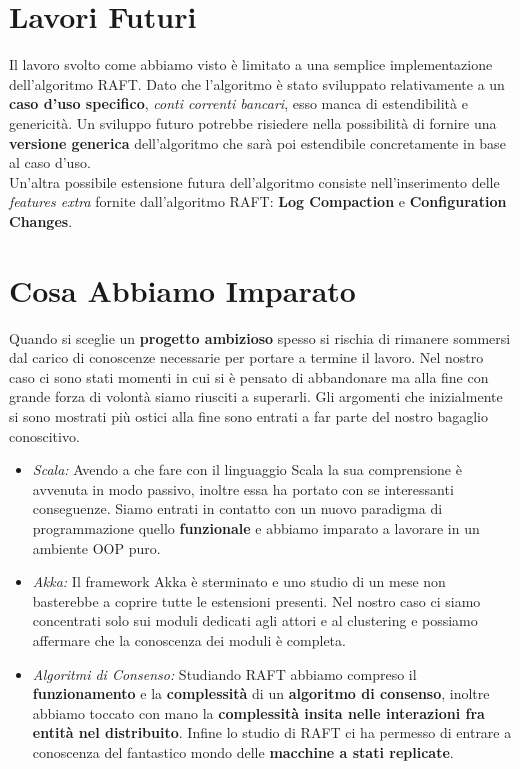 \section{Lavori Futuri}
  Il lavoro svolto come abbiamo visto è limitato a una semplice implementazione dell'algoritmo RAFT. Dato che l'algoritmo è stato sviluppato relativamente a un \textbf{caso d'uso specifico}, \textit{conti correnti bancari}, esso manca di estendibilità e genericità. Un sviluppo futuro potrebbe risiedere nella possibilità di fornire una \textbf{versione generica} dell'algoritmo che sarà poi estendibile concretamente in base al caso d'uso.\\
  Un'altra possibile estensione futura dell'algoritmo consiste nell'inserimento delle \textit{features extra} fornite dall'algoritmo RAFT: \textbf{Log Compaction} e \textbf{Configuration Changes}.

\section{Cosa Abbiamo Imparato}
  Quando si sceglie un \textbf{progetto ambizioso} spesso si rischia di rimanere sommersi dal carico di conoscenze necessarie per portare a termine il lavoro. Nel nostro caso ci sono stati momenti in cui si è pensato di abbandonare ma alla fine con grande forza di volontà siamo riusciti a superarli. Gli argomenti che inizialmente si sono mostrati più ostici alla fine sono entrati a far parte del nostro bagaglio conoscitivo.
  \begin{itemize}
    \item{\emph{Scala:}}
    Avendo a che fare con il linguaggio Scala la sua comprensione è avvenuta in modo passivo, inoltre essa ha portato con se interessanti conseguenze. Siamo entrati in contatto con un nuovo paradigma di programmazione quello \textbf{funzionale} e abbiamo imparato a lavorare in un ambiente OOP puro.
    \item{\emph{Akka:}}
    Il framework Akka è sterminato e uno studio di un mese non basterebbe a coprire tutte le estensioni presenti. Nel nostro caso ci siamo concentrati solo sui moduli dedicati agli attori e al clustering e possiamo affermare che la conoscenza dei moduli è completa.
    \item{\emph{Algoritmi di Consenso:}}
    Studiando RAFT abbiamo compreso il \textbf{funzionamento} e la \textbf{complessità} di un \textbf{algoritmo di consenso}, inoltre abbiamo toccato con mano la \textbf{complessità insita nelle interazioni fra entità nel distribuito}. Infine lo studio di RAFT ci ha permesso di entrare a conoscenza del fantastico mondo delle \textbf{macchine a stati replicate}.
  \end{itemize}


